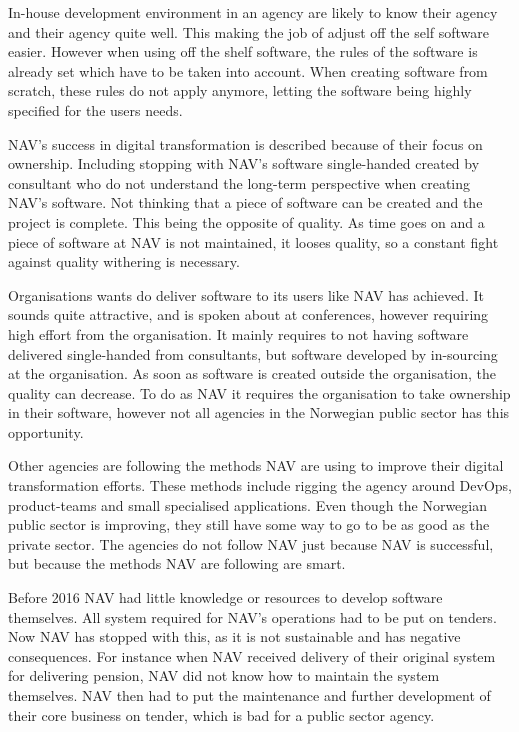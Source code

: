 In-house development environment in an agency are likely to know their agency and their agency quite well. This making the job of adjust off the self software easier. However when using off the shelf software, the rules of the software is already set which have to be taken into account. When creating software from scratch, these rules do not apply anymore, letting the software being highly specified for the users needs.

NAV's success in digital transformation is described because of their focus on ownership. Including stopping with NAV's software single-handed created by consultant who do not understand the long-term perspective when creating NAV's software. Not thinking that a piece of software can be created and the project is complete. This being the opposite of quality. As time goes on and a piece of software at NAV is not maintained, it looses quality, so a constant fight against quality withering is necessary.

Organisations wants do deliver software to its users like NAV has achieved. It sounds quite attractive, and is spoken about at conferences, however requiring high effort from the organisation. It mainly requires to not having software delivered single-handed from consultants, but software developed by in-sourcing at the organisation. As soon as software is created outside the organisation, the quality can decrease. To do as NAV it requires the organisation to take ownership in their software, however not all agencies in the Norwegian public sector has this opportunity.

Other agencies are following the methods NAV are using to improve their digital transformation efforts. These methods include rigging the agency around DevOps, product-teams and small specialised applications. Even though the Norwegian public sector is improving, they still have some way to go to be as good as the private sector. The agencies do not follow NAV just because NAV is successful, but because the methods NAV are following are smart.

Before 2016 NAV had little knowledge or resources to develop software themselves. All system required for NAV's operations had to be put on tenders. Now NAV has stopped with this, as it is not sustainable and has negative consequences. For instance when NAV received delivery of their original system for delivering pension, NAV did not know how to maintain the system themselves. NAV then had to put the maintenance and further development of their core business on tender, which is bad for a public sector agency.

